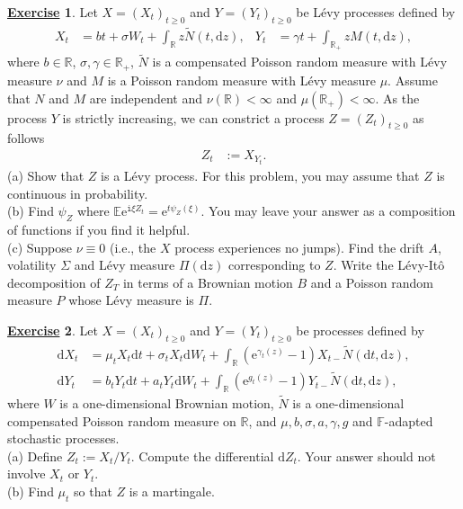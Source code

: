 \documentclass[12pt]{book}
\numberwithin{equation}{chapter}
\theoremstyle{plain}
\numberwithin{theorem}{section}
\theoremstyle{definition}
\newtheorem{exercise}{\underline{Exercise}}
\numberwithin{exercise}{chapter}
\newcommand{\<}{\langle}
\renewcommand{\>}{\rangle}
\renewcommand{\(}{\left(}
\renewcommand{\)}{\right)}
\renewcommand{\[}{\left[}
\renewcommand{\]}{\right]}
\newcommand\Eb{\mathds{E}}
\newcommand\Fb{\mathds{F}}
\newcommand\Rb{\mathds{R}}
\newcommand\sig{\sigma}
\newcommand\Sig{\Sigma}
\newcommand\gam{\gamma}
\newcommand\Nt{\widetilde{N}}
\newcommand\ii{\mathtt{i}}
\newcommand\dd{\mathrm{d}}
\newcommand\ee{\mathrm{e}}
\begin{document}
\begin{exercise}
\label{exer:10.2}
Let $X = (X_t)_{t \geq 0}$ and $Y=(Y_t)_{t \geq 0}$ be L\'evy processes defined by
\begin{align}
X_t
	&=	b t + \sig W_t + \int_{\Rb} z \Nt(t, \dd z) , &
Y_t
	&=	\gam t + \int_{\Rb_+} z M(t, \dd z) ,
\end{align} 
where $b \in \Rb$, $\sig, \gam \in \Rb_+$, $\Nt$ is a compensated Poisson random measure with L\'evy measure $\nu$ and $M$ is a Poisson random measure with L\'evy measure $\mu$.  Assume that $N$ and $M$ are independent and $\nu(\Rb) < \infty$ and $\mu(\Rb_+) < \infty$.  As the process $Y$ is strictly increasing, we can constrict a process $Z = (Z_t)_{t \geq 0}$ as follows
\begin{align}
Z_t
	&:= X_{Y_t} .
\end{align}
(a) Show that $Z$ is a L\'evy process.  For this problem, you may assume that $Z$ is continuous in probability.\\
(b) Find $\psi_Z$ where $\Eb \ee^{\ii \xi Z_t} = \ee^{t \psi_Z(\xi)}$.  You may leave your answer as a composition of functions if you find it helpful.\\
(c) Suppose $\nu \equiv 0$ (i.e., the $X$ process experiences no jumps).  Find the drift $A$, volatility $\Sig$ and L\'evy measure $\Pi(\dd z)$ corresponding to $Z$.
Write the L\'evy-It\^o decomposition of $Z_T$ in terms of a Brownian motion $B$ and a Poisson random measure $P$ whose L\'evy measure is $\Pi$.
\end{exercise}

\begin{exercise}
\label{exer:10.3}
Let $X = (X_t)_{t \geq 0}$ and $Y=(Y_t)_{t \geq 0}$ be processes defined by
\begin{align}
\dd X_t
	&=	\mu_t X_t \dd t + \sig_t X_t \dd W_t + \int_\Rb (\ee^{\gam_t(z)} - 1 ) X_{t-} \Nt( \dd t, \dd z) , \\
\dd Y_t
	&=	b_t Y_t \dd t + a_t Y_t \dd W_t + \int_\Rb (\ee^{g_t(z)} - 1 ) Y_{t-} \Nt( \dd t, \dd z) ,
\end{align} 
where $W$ is a one-dimensional Brownian motion, $\Nt$ is a one-dimensional compensated Poisson random measure on $\Rb$, and $\mu, b, \sig, a, \gam, g$ and $\Fb$-adapted stochastic processes.\\
(a) Define $Z_t := X_t / Y_t$.  Compute the differential $\dd Z_t$.  Your answer should not involve $X_t$ or $Y_t$.\\
(b) Find $\mu_t$ so that $Z$ is a martingale.
\end{exercise}
\end{document}
